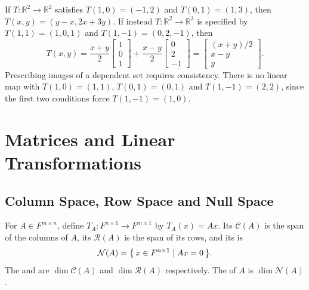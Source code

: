 \begin{Example}
If $T\colon\mathbb R^2\to\mathbb R^2$ satisfies $T(1,0)=(-1,2)$ and $T(0,1)=(1,3)$, then $T(x,y)=(y-x,2x+3y)$. If instead $T\colon\mathbb R^2\to\mathbb R^3$ is specified by $T(1,1)=(1,0,1)$ and $T(1,-1)=(0,2,-1)$, then
\begin{equation*}
T(x,y)=\frac{x+y}{2}\begin{bmatrix}1\\0\\1\end{bmatrix}+\frac{x-y}{2}\begin{bmatrix}0\\2\\-1\end{bmatrix}=\begin{bmatrix}(x+y)/2\\x-y\\y\end{bmatrix}.
\end{equation*}
Prescribing images of a dependent set requires consistency. There is no linear map with $T(1,0)=(1,1)$, $T(0,1)=(0,1)$ and $T(1,-1)=(2,2)$, since the first two conditions force $T(1,-1)=(1,0)$.
\end{Example}

\section{Matrices and Linear Transformations}\label{sec:Matrices}

\subsection{Column Space, Row Space and Null Space}

\begin{Definition}
For $A\in F^{m\times n}$, define $T_A\colon F^{n\times1}\to F^{m\times1}$ by $T_A(x)=Ax$. Its  $\mathcal C(A)$ is the span of the columns of $A$, its  $\mathcal R(A)$ is the span of its rows, and its  is
\begin{equation*}
\mathcal N(A)=\qty{\, x\in F^{n\times1} \mid Ax=0 \,}.
\end{equation*}
The  and  are $\dim\mathcal C(A)$ and $\dim\mathcal R(A)$ respectively. The  of $A$ is $\dim\mathcal N(A)$.
\end{Definition}

